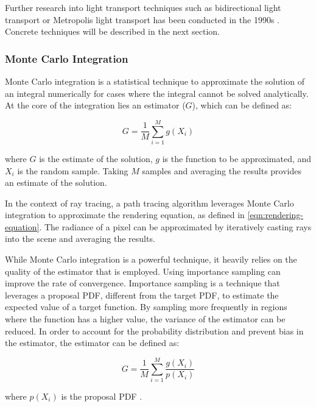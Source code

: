 Further research into light transport techniques such as bidirectional light transport or Metropolis light transport has been conducted in the 1990s \cite{veachMonteCarloLightTransport}. Concrete techniques will be described in the next section.

\subsubsection{Monte Carlo Integration}
\label{sec:monte-carlo-integration-sampling}

Monte Carlo integration is a statistical technique to approximate the solution of an integral numerically for cases where the integral cannot be solved analytically. At the core of the integration lies an estimator ($G$), which can be defined as:

\begin{equation}
  G = \frac{1}{M}\sum_{i=1}^M g(X_i)
  \label{eq:monteCarlo}
\end{equation}

where $G$ is the estimate of the solution, $g$ is the function to be approximated, and $X_i$ is the random sample. Taking $M$ samples and averaging the results provides an estimate of the solution. \cite{kalos2009monte}

In the context of ray tracing, a path tracing algorithm leverages Monte Carlo integration to approximate the rendering equation, as defined in \autoref{eqn:rendering-equation}. The radiance of a pixel can be approximated by iteratively casting rays into the scene and averaging the results.

While Monte Carlo integration is a powerful technique, it heavily relies on the quality of the estimator that is employed. Using importance sampling can improve the rate of convergence. Importance sampling is a technique that leverages a proposal \gls{PDF}, different from the target \gls{PDF}, to estimate the expected value of a target function. By sampling more frequently in regions where the function has a higher value, the variance of the estimator can be reduced. In order to account for the probability distribution and prevent bias in the estimator, the estimator can be defined as:

\begin{equation}
  G = \frac{1}{M}\sum_{i=1}^M \frac{g(X_i)}{p(X_i)}
  \label{eq:importanceSampling}
\end{equation}

where $p(X_i)$ is the proposal \gls{PDF} \cite{Pharr_Physically_Based_Rendering_2023}.

